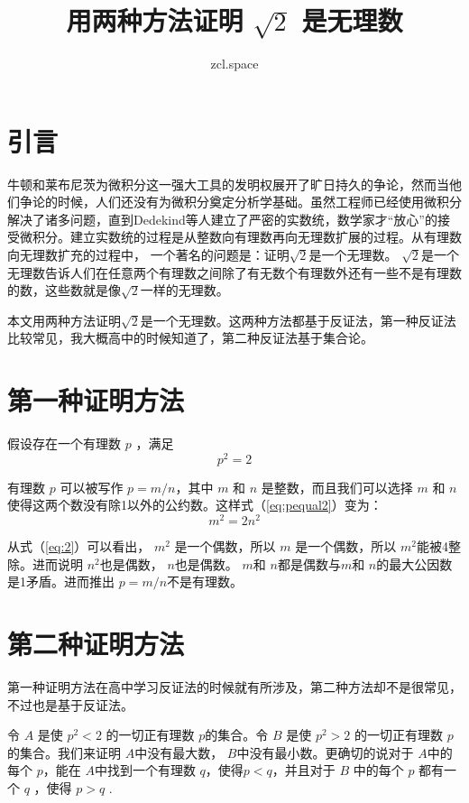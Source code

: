 \documentclass[10pt,a4paper,UTF8]{article}
\author{zcl.space}
\date{}
\title{用两种方法证明 \(\sqrt{2}\) 是无理数}
\begin{document}
\maketitle
\tableofcontents


\section{引言}
\label{sec:orge15f051}


牛顿和莱布尼茨为微积分这一强大工具的发明权展开了旷日持久的争论，然而当他们争论的时候，人们还没有为微积分奠定分析学基础。虽然工程师已经使用微积分解决了诸多问题，直到Dedekind等人建立了严密的实数统，数学家才“放心”的接受微积分。建立实数统的过程是从整数向有理数再向无理数扩展的过程。从有理数向无理数扩充的过程中， 一个著名的问题是：证明\(\sqrt{2}\)是一个无理数。 \(\sqrt{2}\)是一个无理数告诉人们在任意两个有理数之间除了有无数个有理数外还有一些不是有理数的数，这些数就是像\(\sqrt{2}\)一样的无理数。

本文用两种方法证明\(\sqrt{2}\)是一个无理数。这两种方法都基于反证法，第一种反证法比较常见，我大概高中的时候知道了，第二种反证法基于集合论。
\section{第一种证明方法}
\label{sec:org27d3026}


假设存在一个有理数 \(p\) ，满足 
\begin{equation}
\label{eq:pequal2}
p^{2} = 2
\end{equation}

有理数 \(p\) 可以被写作 \(p=m/n\)，其中 \(m\) 和 \(n\) 是整数，而且我们可以选择 \(m\) 和 \(n\)使得这两个数没有除1以外的公约数。这样式（\ref{eq:pequal2}）变为：
\begin{equation}
\label{eq:2}
m^{2} = 2n^{2}
\end{equation}

从式（\ref{eq:2}）可以看出， \(m^{2}\) 是一个偶数，所以 \(m\) 是一个偶数，所以 \(m^{2}\)能被4整除。进而说明 \(n^{2}\)也是偶数， \(n\)也是偶数。 \(m\)和 \(n\)都是偶数与\(m\)和 \(n\)的最大公因数是1矛盾。进而推出 \(p=m/n\)不是有理数。
\section{第二种证明方法}
\label{sec:orgb3d15df}


第一种证明方法在高中学习反证法的时候就有所涉及，第二种方法却不是很常见，不过也是基于反证法。

令 \(A\) 是使 \(p^{2}<2\) 的一切正有理数 \(p\)的集合。令 \(B\) 是使 \(p^{2}>2\) 的一切正有理数 \(p\)的集合。我们来证明 \(A\)中没有最大数， \(B\)中没有最小数。更确切的说对于 \(A\)中的每个 \(p\)，能在 \(A\)中找到一个有理数 \(q\)，使得\(p {<} q\)，并且对于 \(B\) 中的每个 \(p\) 都有一个 \(q\) ，使得 \(p {>} q\) .
\end{document}
